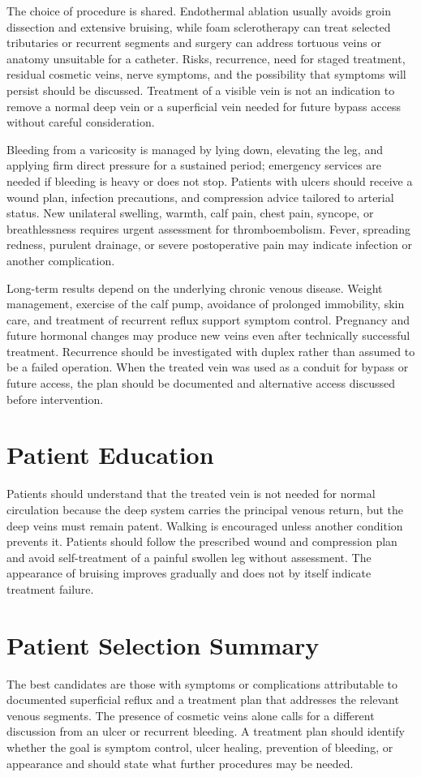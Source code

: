 The choice of procedure is shared. Endothermal ablation usually avoids groin dissection and extensive bruising, while foam sclerotherapy can treat selected tributaries or recurrent segments and surgery can address tortuous veins or anatomy unsuitable for a catheter. Risks, recurrence, need for staged treatment, residual cosmetic veins, nerve symptoms, and the possibility that symptoms will persist should be discussed. Treatment of a visible vein is not an indication to remove a normal deep vein or a superficial vein needed for future bypass access without careful consideration.

Bleeding from a varicosity is managed by lying down, elevating the leg, and applying firm direct pressure for a sustained period; emergency services are needed if bleeding is heavy or does not stop. Patients with ulcers should receive a wound plan, infection precautions, and compression advice tailored to arterial status. New unilateral swelling, warmth, calf pain, chest pain, syncope, or breathlessness requires urgent assessment for thromboembolism. Fever, spreading redness, purulent drainage, or severe postoperative pain may indicate infection or another complication.

Long-term results depend on the underlying chronic venous disease. Weight management, exercise of the calf pump, avoidance of prolonged immobility, skin care, and treatment of recurrent reflux support symptom control. Pregnancy and future hormonal changes may produce new veins even after technically successful treatment. Recurrence should be investigated with duplex rather than assumed to be a failed operation. When the treated vein was used as a conduit for bypass or future access, the plan should be documented and alternative access discussed before intervention.

\section*{Patient Education}
Patients should understand that the treated vein is not needed for normal circulation because the deep system carries the principal venous return, but the deep veins must remain patent. Walking is encouraged unless another condition prevents it. Patients should follow the prescribed wound and compression plan and avoid self-treatment of a painful swollen leg without assessment. The appearance of bruising improves gradually and does not by itself indicate treatment failure.

\section*{Patient Selection Summary}
The best candidates are those with symptoms or complications attributable to documented superficial reflux and a treatment plan that addresses the relevant venous segments. The presence of cosmetic veins alone calls for a different discussion from an ulcer or recurrent bleeding. A treatment plan should identify whether the goal is symptom control, ulcer healing, prevention of bleeding, or appearance and should state what further procedures may be needed.

